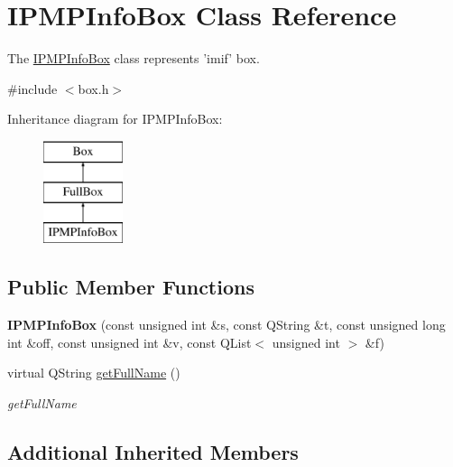 \hypertarget{class_i_p_m_p_info_box}{\section{I\-P\-M\-P\-Info\-Box Class Reference}
\label{class_i_p_m_p_info_box}
}


The \hyperlink{class_i_p_m_p_info_box}{I\-P\-M\-P\-Info\-Box} class represents 'imif' box.  




{\ttfamily \#include $<$box.\-h$>$}

Inheritance diagram for I\-P\-M\-P\-Info\-Box\-:\begin{figure}[H]
\begin{center}
\leavevmode
\includegraphics[height=3.000000cm]{class_i_p_m_p_info_box}
\end{center}
\end{figure}
\subsection*{Public Member Functions}
\begin{DoxyCompactItemize}
\item 
\hypertarget{class_i_p_m_p_info_box_aedab61143da41997c6dfc121a3982297}{{\bfseries I\-P\-M\-P\-Info\-Box} (const unsigned int \&s, const Q\-String \&t, const unsigned long int \&off, const unsigned int \&v, const Q\-List$<$ unsigned int $>$ \&f)}\label{class_i_p_m_p_info_box_aedab61143da41997c6dfc121a3982297}

\item 
virtual Q\-String \hyperlink{class_i_p_m_p_info_box_aef8ac41ff48a6fa3ce83f81dbdd369a1}{get\-Full\-Name} ()
\begin{DoxyCompactList}\small\item\em get\-Full\-Name \end{DoxyCompactList}\end{DoxyCompactItemize}
\subsection*{Additional Inherited Members}


